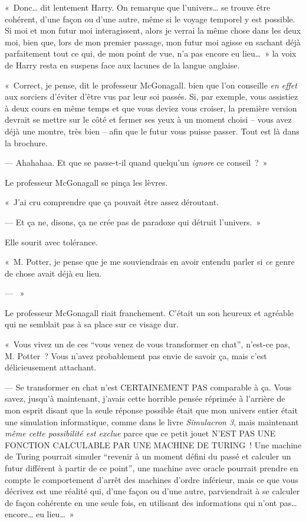 «~Donc… dit lentement Harry. On remarque que l'univers… se trouve être cohérent, d'une façon ou d'une autre, même si le voyage temporel y est possible. Si moi et mon futur moi interagissent, alors je verrai la même chose dans les deux moi, bien que, lors de mon premier passage, mon futur moi agisse en sachant déjà parfaitement tout ce qui, de mon point de vue, n'a pas encore eu lieu…~» la voix de Harry resta en suspens face aux lacunes de la langue anglaise.

«~Correct, je pense, dit le professeur McGonagall. bien que l'on conseille \emph{en effet} aux sorciers d'éviter d'être vus par leur soi passés. Si, par exemple, vous assistiez à deux cours en même temps et que vous deviez vous croiser, la première version devrait se mettre sur le côté et fermer ses yeux à un moment choisi -- vous avez déjà une montre, très bien -- afin que le futur vous puisse passer. Tout est là dans la brochure.

--- Ahahahaa. Et que se passe-t-il quand quelqu'un \emph{ignore} ce conseil~?~»

Le professeur McGonagall se pinça les lèvres.

«~J'ai cru comprendre que ça pouvait être assez déroutant.

--- Et ça ne, disons, ça ne crée pas de paradoxe qui détruit l'univers.~»

Elle sourit avec tolérance.

«~M. Potter, je pense que je me souviendrais en avoir entendu parler si \emph{ce} genre de chose avait déjà eu lieu.

--- ~»

Le professeur McGonagall riait franchement. C'était un son heureux et agréable qui ne semblait pas à sa place sur ce visage dur.

«~Vous vivez un de ces “vous venez de vous transformer en chat”, n'est-ce pas, M. Potter~? Vous n'avez probablement pas envie de savoir ça, mais c'est délicieusement attachant.

--- Se transformer en chat n'est CERTAINEMENT PAS comparable à ça. Vous savez, jusqu'à maintenant, j'avais cette horrible pensée réprimée à l'arrière de mon esprit disant que la seule réponse possible était que mon univers entier était une simulation informatique, comme dans le livre \emph{Simulacron 3}, mais maintenant \emph{même cette possibilité est exclue} parce que ce petit jouet N'EST PAS UNE FONCTION CALCULABLE PAR UNE MACHINE DE TURING~! Une machine de Turing pourrait simuler “revenir à un moment défini du passé et calculer un futur différent à partir de ce point”, une machine avec oracle pourrait prendre en compte le comportement d'arrêt des machines d'ordre inférieur, mais ce que vous décrivez est une réalité qui, d'une façon ou d'une autre, parviendrait à se calculer de façon cohérente en une seule fois, en utilisant des informations qui n'ont pas… encore… eu lieu…~»

